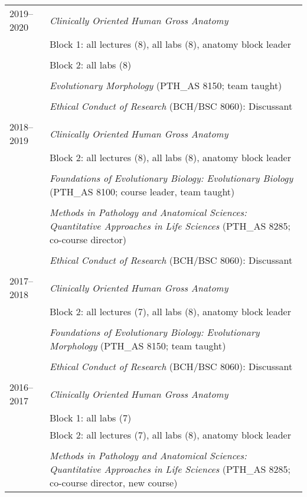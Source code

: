 \begin{longtable}{@{}lX@{}}
  2019--2020 & \textit{Clinically Oriented Human Gross Anatomy}\\
  & Block 1: all lectures (8), all labs (8), anatomy block leader\\
  \\
  & Block 2: all labs (8)\\
  \\
  & \textit{Evolutionary Morphology} (PTH\_AS 8150; team taught)\\
  \\
  & \textit{Ethical Conduct of Research} (BCH/BSC 8060): Discussant\\
  \\
  2018--2019 & \textit{Clinically Oriented Human Gross Anatomy}\\
  & Block 2: all lectures (8), all labs (8), anatomy block leader\\
  \\
  & \textit{Foundations of Evolutionary Biology: Evolutionary Biology} (PTH\_AS 8100; course leader, team taught)\\
  \\
  & \textit{Methods in Pathology and Anatomical Sciences: Quantitative Approaches in Life Sciences} (PTH\_AS 8285; co-course director)\\
  \\
  & \textit{Ethical Conduct of Research} (BCH/BSC 8060): Discussant\\
  \\
  2017--2018 & \textit{Clinically Oriented Human Gross Anatomy}\\
  & Block 2: all lectures (7), all labs (8), anatomy block leader\\
  \\
  & \textit{Foundations of Evolutionary Biology: Evolutionary Morphology} (PTH\_AS 8150; team taught)\\
  \\
  & \textit{Ethical Conduct of Research} (BCH/BSC 8060): Discussant\\
  \\
    2016--2017 & \textit{Clinically Oriented Human Gross Anatomy}\\
    & Block 1: all labs (7)\\
    & Block 2: all lectures (7), all labs (8), anatomy block leader\\
    \\
    & \textit{Methods in Pathology and Anatomical Sciences: Quantitative Approaches in Life Sciences} (PTH\_AS 8285; co-course director, new course)\\

\end{longtable}
